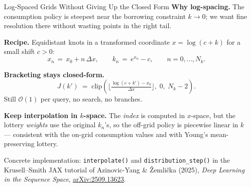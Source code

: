 \documentclass[aspectratio=169,11pt]{beamer}
\begin{document}
\begin{frame}{Log-Spaced Grids Without Giving Up the Closed Form}
\footnotesize
\textbf{Why log-spacing.}  The consumption policy is steepest near the borrowing constraint $k\!\to\!0$; we want fine resolution there without wasting points in the right tail.

\vspace{0.4em}
\textbf{Recipe.}  Equidistant knots in a transformed coordinate $x = \log(c+k)$ for a small shift $c>0$:
\[
  x_n \,=\, x_0 + n\,\Delta x,\qquad k_n \,=\, e^{x_n} - c,\qquad n=0,\dots,N_k.
\]

\vspace{0.4em}
\textbf{Bracketing stays closed-form.}
\[
  J(k') \;=\; \mathrm{clip}\!\left(\Big\lfloor \tfrac{\log(c+k') - x_0}{\Delta x}\Big\rfloor,\;0,\;N_k-2\right).
\]
Still $\mathcal{O}(1)$ per query, no search, no branches.

\vspace{0.4em}
\textbf{Keep interpolation in $k$-space.}  The \emph{index} is computed in $x$-space, but the lottery \emph{weights} use the original $k_n$'s, so the off-grid policy is piecewise linear in $k$ --- consistent with the on-grid consumption values and with Young's mean-preserving lottery.

\vfill
{\scriptsize Concrete implementation: \texttt{interpolate()} and \texttt{distribution\_step()} in the Krusell--Smith JAX tutorial of Azinovic-Yang \& \v{Z}emli\v{c}ka (2025), \emph{Deep Learning in the Sequence Space}, \href{https://arxiv.org/abs/2509.13623}{arXiv:2509.13623}.}
\end{frame}
\end{document}
